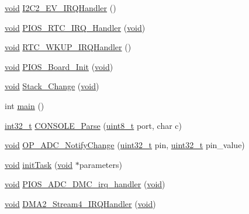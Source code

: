 \begin{DoxyCompactItemize}
\item 
\hyperlink{group___n_a_m_e_ga18028b8badbf1ea7e704ccac3c488e82}{void} \hyperlink{group___open_pilot_core_gaa32a80208798d6132876a58823ff6202}{I2\-C2\-\_\-\-E\-V\-\_\-\-I\-R\-Q\-Handler} ()
\item 
\hyperlink{group___n_a_m_e_ga18028b8badbf1ea7e704ccac3c488e82}{void} \hyperlink{group___open_pilot_core_gadc73bf2eccd9d9ff9d8efedd1e743704}{P\-I\-O\-S\-\_\-\-R\-T\-C\-\_\-\-I\-R\-Q\-\_\-\-Handler} (\hyperlink{group___n_a_m_e_ga18028b8badbf1ea7e704ccac3c488e82}{void})
\item 
\hyperlink{group___n_a_m_e_ga18028b8badbf1ea7e704ccac3c488e82}{void} \hyperlink{group___open_pilot_core_ga7e78266985c97f3b7e8a9f91893657d1}{R\-T\-C\-\_\-\-W\-K\-U\-P\-\_\-\-I\-R\-Q\-Handler} ()
\item 
\hyperlink{group___n_a_m_e_ga18028b8badbf1ea7e704ccac3c488e82}{void} \hyperlink{group___open_pilot_core_ga902009c5b1cb57d9f9d60092eb7cacfb}{P\-I\-O\-S\-\_\-\-Board\-\_\-\-Init} (\hyperlink{group___n_a_m_e_ga18028b8badbf1ea7e704ccac3c488e82}{void})
\item 
\hyperlink{group___n_a_m_e_ga18028b8badbf1ea7e704ccac3c488e82}{void} \hyperlink{group___open_pilot_core_ga7a789e7b91612099a4a1f355b9e97c24}{Stack\-\_\-\-Change} (\hyperlink{group___n_a_m_e_ga18028b8badbf1ea7e704ccac3c488e82}{void})
\item 
int \hyperlink{group___open_pilot_core_gae66f6b31b5ad750f1fe042a706a4e3d4}{main} ()
\item 
\hyperlink{group___n_a_m_e_gafd12020da5a235dfcf0c3c748fb5baed}{int32\-\_\-t} \hyperlink{group___open_pilot_core_gad672ccb166952265b4fffa10cfd19a14}{C\-O\-N\-S\-O\-L\-E\-\_\-\-Parse} (\hyperlink{stdint_8h_aba7bc1797add20fe3efdf37ced1182c5}{uint8\-\_\-t} port, char c)
\item 
\hyperlink{group___n_a_m_e_ga18028b8badbf1ea7e704ccac3c488e82}{void} \hyperlink{group___open_pilot_core_gaa65cbf2d7f8e88a2d332c7c6ce13dd1c}{O\-P\-\_\-\-A\-D\-C\-\_\-\-Notify\-Change} (\hyperlink{stdint_8h_a435d1572bf3f880d55459d9805097f62}{uint32\-\_\-t} pin, \hyperlink{stdint_8h_a435d1572bf3f880d55459d9805097f62}{uint32\-\_\-t} pin\-\_\-value)
\item 
\hyperlink{group___n_a_m_e_ga18028b8badbf1ea7e704ccac3c488e82}{void} \hyperlink{group___open_pilot_core_gae7ecc4ed0ea5858477b78acaf928c3ef}{init\-Task} (\hyperlink{group___n_a_m_e_ga18028b8badbf1ea7e704ccac3c488e82}{void} $\ast$parameters)
\item 
\hyperlink{group___n_a_m_e_ga18028b8badbf1ea7e704ccac3c488e82}{void} \hyperlink{group___open_pilot_core_gadc9219e22dc694e541870e52af1962dd}{P\-I\-O\-S\-\_\-\-A\-D\-C\-\_\-\-D\-M\-C\-\_\-irq\-\_\-handler} (\hyperlink{group___n_a_m_e_ga18028b8badbf1ea7e704ccac3c488e82}{void})
\item 
\hyperlink{group___n_a_m_e_ga18028b8badbf1ea7e704ccac3c488e82}{void} \hyperlink{group___open_pilot_core_ga295198ed574625d416158a5fc54205ea}{D\-M\-A2\-\_\-\-Stream4\-\_\-\-I\-R\-Q\-Handler} (\hyperlink{group___n_a_m_e_ga18028b8badbf1ea7e704ccac3c488e82}{void})
\end{DoxyCompactItemize}
